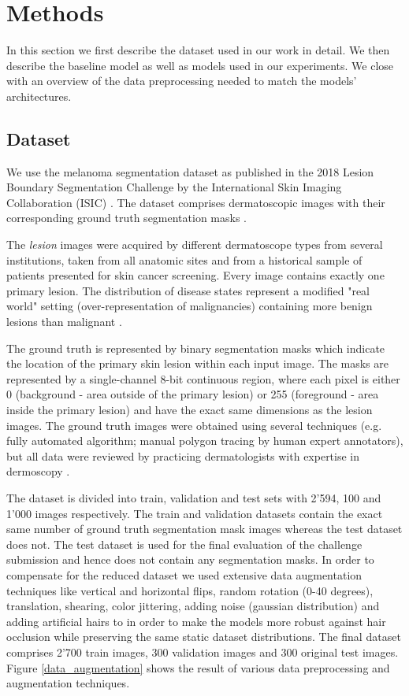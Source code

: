 \section{Methods}
In this section we first describe the dataset used in our work in detail. We then describe the baseline model as well as models used in our experiments. We close with an overview of the data preprocessing needed to match the models’ architectures.

\subsection{Dataset}
\label{dataset}
We use the melanoma segmentation dataset as published in the 2018 Lesion Boundary Segmentation Challenge by the International Skin Imaging Collaboration (ISIC) \citep{isic-2018-segmentation}. The dataset comprises dermatoscopic images with their corresponding ground truth segmentation masks \citep{ensambles-2016-codella}.

\par
The \emph{lesion} images were acquired by different dermatoscope types from several institutions, taken from all anatomic sites and from a historical sample of patients presented for skin cancer screening. Every image contains exactly one primary lesion. The distribution of disease states represent a modified "real world" setting (over-representation of malignancies) containing more benign lesions than malignant \citep{isic-2018-segmentation}.

\par
The ground truth is represented by binary segmentation masks which indicate the location of the primary skin lesion within each input image. The masks are represented by a single-channel 8-bit continuous region, where each pixel is either 0 (background - area outside of the primary lesion) or 255 (foreground - area inside the primary lesion) and have the exact same dimensions as the lesion images. The ground truth images were obtained using several techniques (e.g. fully automated algorithm; manual polygon tracing by human expert annotators), but all data were reviewed by practicing dermatologists with expertise in dermoscopy \citep{isic-2018-segmentation,ensambles-2016-codella}.

\par
The dataset is divided into train, validation and test sets with 2’594, 100 and 1’000 images respectively. The train and validation datasets contain the exact same number of ground truth segmentation mask images whereas the test dataset does not. The test dataset is used for the final evaluation of the challenge submission and hence does not contain any segmentation masks. In order to compensate for the reduced dataset we used extensive data augmentation techniques like vertical and horizontal flips, random rotation (0-40 degrees), translation, shearing, color jittering, adding noise (gaussian distribution) and adding artificial hairs to in order to make the models more robust against hair occlusion while preserving the same static dataset distributions. The final dataset comprises 2’700 train images, 300 validation images and 300 original test images. Figure \ref{data_augmentation} shows the result of various data preprocessing and augmentation techniques.

